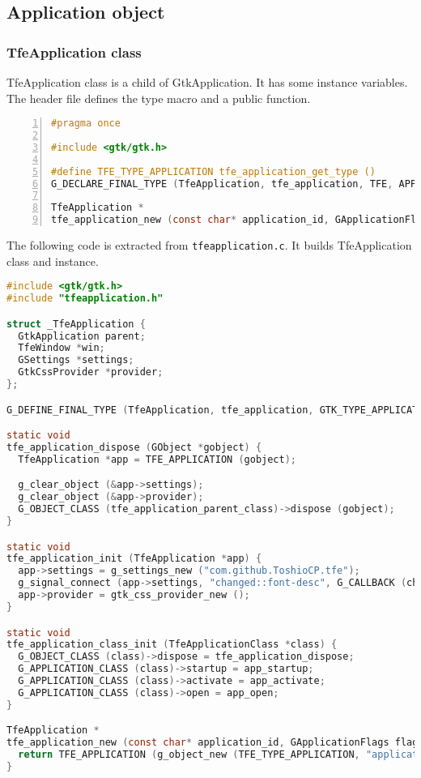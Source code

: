 \subsection{Application object}\label{application-object}

\subsubsection{TfeApplication class}\label{tfeapplication-class}

TfeApplication class is a child of GtkApplication. It has some instance
variables. The header file defines the type macro and a public function.

\begin{lstlisting}[language=C, numbers=left]
#pragma once

#include <gtk/gtk.h>

#define TFE_TYPE_APPLICATION tfe_application_get_type ()
G_DECLARE_FINAL_TYPE (TfeApplication, tfe_application, TFE, APPLICATION, GtkApplication)

TfeApplication *
tfe_application_new (const char* application_id, GApplicationFlags flag);
\end{lstlisting}

The following code is extracted from
\passthrough{\lstinline!tfeapplication.c!}. It builds TfeApplication
class and instance.

\begin{lstlisting}[language=C]
#include <gtk/gtk.h>
#include "tfeapplication.h"

struct _TfeApplication {
  GtkApplication parent;
  TfeWindow *win;
  GSettings *settings;
  GtkCssProvider *provider;
};

G_DEFINE_FINAL_TYPE (TfeApplication, tfe_application, GTK_TYPE_APPLICATION)

static void
tfe_application_dispose (GObject *gobject) {
  TfeApplication *app = TFE_APPLICATION (gobject);

  g_clear_object (&app->settings);
  g_clear_object (&app->provider);
  G_OBJECT_CLASS (tfe_application_parent_class)->dispose (gobject);
}

static void
tfe_application_init (TfeApplication *app) {
  app->settings = g_settings_new ("com.github.ToshioCP.tfe");
  g_signal_connect (app->settings, "changed::font-desc", G_CALLBACK (changed_font_cb), app);
  app->provider = gtk_css_provider_new ();
}

static void
tfe_application_class_init (TfeApplicationClass *class) {
  G_OBJECT_CLASS (class)->dispose = tfe_application_dispose;
  G_APPLICATION_CLASS (class)->startup = app_startup;
  G_APPLICATION_CLASS (class)->activate = app_activate;
  G_APPLICATION_CLASS (class)->open = app_open;
}

TfeApplication *
tfe_application_new (const char* application_id, GApplicationFlags flag) {
  return TFE_APPLICATION (g_object_new (TFE_TYPE_APPLICATION, "application-id", application_id, "flags", flag, NULL));
}
\end{lstlisting}


